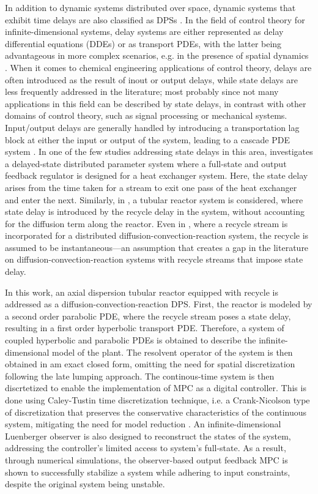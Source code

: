 In addition to dynamic systems distributed over space, dynamic systems that exhibit time delays are also classified as DPSs \cite{curtainbook}. 
In the field of control theory for infinite-dimensional systems, delay systems are either represented as delay differential equations (DDEs) or as transport PDEs, with the latter being advantageous in more complex scenarios, e.g. in the presence of spatial dynamics \cite{krstic2009book}. 
When it comes to chemical engineering applications of control theory, delays are often introduced as the result of inout or output delays, while state delays are less frequently addressed in the literature; most probably since not many applications in this field can be described by state delays, in contrast with other domains of control theory, such as signal processing or mechanical systems. 
Input/output delays are generally handled by introducing a transportation lag block at either the input or output of the system, leading to a cascade PDE system \cite{Hiratsuka1969IEEE, mohammadi2012lq, Guilherme2019ACC}. 
In one of the few studies addressing state delays in this area, \cite{ozorio2019heat} investigates a delayed-state distributed parameter system where a full-state and output feedback regulator is designed for a heat exchanger system. 
Here, the state delay arises from the time taken for a stream to exit one pass of the heat exchanger and enter the next. 
Similarly, in \cite{qi2021output}, a tubular reactor system is considered, where state delay is introduced by the recycle delay in the system, without accounting for the diffusion term along the reactor. 
Even in \cite{khatibi2021model}, where a recycle stream is incorporated for a distributed diffusion-convection-reaction system, the recycle is assumed to be instantaneous—an assumption that creates a gap in the literature on diffusion-convection-reaction systems with recycle streams that impose state delay.

In this work, an axial dispersion tubular reactor equipped with recycle is addressed as a diffusion-convection-reaction DPS. First, the reactor is modeled by a second order parabolic PDE, where the recycle stream poses a state delay, resulting in a first order hyperbolic transport PDE. 
Therefore, a system of coupled hyperbolic and parabolic PDEs is obtained to describe the infinite-dimensional model of the plant. 
The resolvent operator of the system is then obtained in am exact closed form, omitting the need for spatial discretization following the late lumping approach. 
The continous-time system is then discrtetized to enable the implementation of MPC as a digital controller. This is done using Caley-Tustin time discretization technique, i.e. a Crank-Nicolson type of discretization that preserves the conservative characteristics of the continuous system, mitigating the need for model reduction \cite{havu2007cayley, xu2017linear}. 
An infinite-dimensional Luenberger observer is also designed to reconstruct the states of the system, addressing the controller's limited access to system's full-state. 
As a result, through numerical simulations, the observer-based output feedback MPC is shown to successfully stabilize a system while adhering to input constraints, despite the original system being unstable.